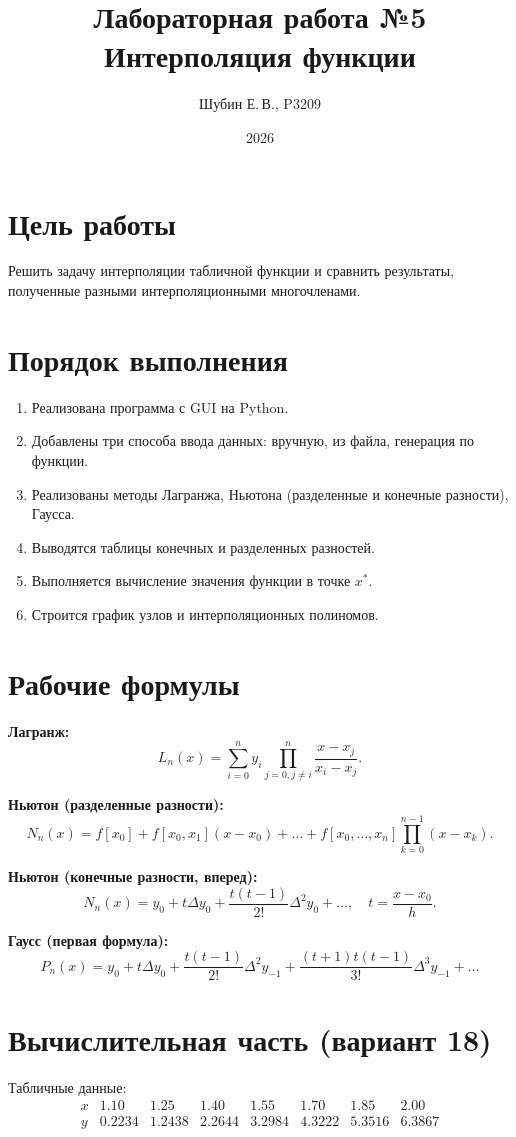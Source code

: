 \documentclass[14pt,a4paper]{extarticle}
\title{Лабораторная работа №5\\Интерполяция функции}
\author{Шубин Е.\,В., P3209}
\date{2026}
\begin{document}
\maketitle

\section*{Цель работы}
Решить задачу интерполяции табличной функции и сравнить результаты, полученные разными интерполяционными многочленами.

\section*{Порядок выполнения}
\begin{enumerate}
    \item Реализована программа с GUI на Python.
    \item Добавлены три способа ввода данных: вручную, из файла, генерация по функции.
    \item Реализованы методы Лагранжа, Ньютона (разделенные и конечные разности), Гаусса.
    \item Выводятся таблицы конечных и разделенных разностей.
    \item Выполняется вычисление значения функции в точке $x^*$.
    \item Строится график узлов и интерполяционных полиномов.
\end{enumerate}

\section*{Рабочие формулы}
\textbf{Лагранж:}
\[
L_n(x)=\sum_{i=0}^{n}y_i\prod_{j=0,j\ne i}^{n}\frac{x-x_j}{x_i-x_j}.
\]

\textbf{Ньютон (разделенные разности):}
\[
N_n(x)=f[x_0]+f[x_0,x_1](x-x_0)+\dots+f[x_0,\dots,x_n]\prod_{k=0}^{n-1}(x-x_k).
\]

\textbf{Ньютон (конечные разности, вперед):}
\[
N_n(x)=y_0+t\Delta y_0+\frac{t(t-1)}{2!}\Delta^2y_0+\dots,\quad t=\frac{x-x_0}{h}.
\]

\textbf{Гаусс (первая формула):}
\[
P_n(x)=y_0+t\Delta y_0+\frac{t(t-1)}{2!}\Delta^2y_{-1}
+\frac{(t+1)t(t-1)}{3!}\Delta^3y_{-1}+\dots
\]

\section*{Вычислительная часть (вариант 18)}
Табличные данные:
\[
\begin{array}{c|ccccccc}
x & 1.10 & 1.25 & 1.40 & 1.55 & 1.70 & 1.85 & 2.00 \\
\hline
y & 0.2234 & 1.2438 & 2.2644 & 3.2984 & 4.3222 & 5.3516 & 6.3867
\end{array}
\]
\end{document}
